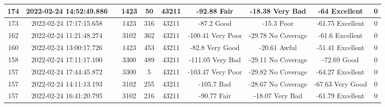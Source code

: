 \begin{longtable*}{|c|c|c|c|c|c|c|c|c|c|}
174&2022-02-24 14:52:49.886&&1423&50&43211& -92.88    Fair        & -18.38    Very Bad    & -64       Excellent   & 0\\\hline
{}173&2022-02-24 17:17:15.658&&1423&316&43211& -87.2     Good        & -15.3     Poor        & -61.75    Excellent   & 0\\\hline
{}162&2022-02-24 11:21:48.274&&3102&362&43211& -100.41   Very Poor   & -29.78    No Coverage & -61.6     Excellent   & 0\\\hline
{}160&2022-02-24 13:00:17.726&&1423&453&43211& -82.8     Very Good   & -20.61    Awful       & -51.41    Excellent   & 0\\\hline
{}158&2022-02-24 17:11:17.100&&3300&489&43211& -111.05   Very Bad    & -29.11    No Coverage & -72.69    Good        & 0\\\hline
{}157&2022-02-24 17:44:45.872&&3300&5&43211& -103.47   Very Poor   & -29.82    No Coverage & -64.27    Excellent   & 0\\\hline
{}157&2022-02-24 14:11:13.193&&3102&255&43211& -105.7    Bad         & -28.67    No Coverage & -67.63    Very Good   & 0\\\hline
{}157&2022-02-24 16:41:20.795&&3102&216&43211& -90.77    Fair        & -18.07    Very Bad    & -61.79    Excellent   & 0\\\hline

\end{longtable*}
